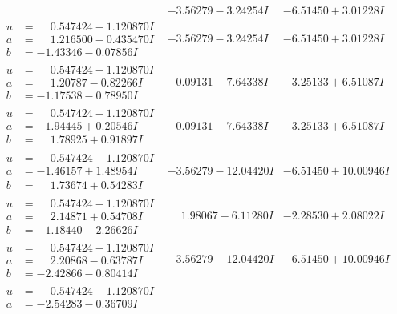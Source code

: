 \documentclass[1p]{elsarticle_modified}
\theoremstyle{definition}
\begin{document}
$$\begin{array}{c|c|c}
 & -3.56279 - 3.24254 I & -6.51450 + 3.01228 I \\ \hline\begin{aligned}
u &= \phantom{-}0.547424 - 1.120870 I \\
a &= \phantom{-}1.216500 - 0.435470 I \\
b &= -1.43346 - 0.07856 I\end{aligned}
 & -3.56279 - 3.24254 I & -6.51450 + 3.01228 I \\ \hline\begin{aligned}
u &= \phantom{-}0.547424 - 1.120870 I \\
a &= \phantom{-}1.20787 - 0.82266 I \\
b &= -1.17538 - 0.78950 I\end{aligned}
 & -0.09131 - 7.64338 I & -3.25133 + 6.51087 I \\ \hline\begin{aligned}
u &= \phantom{-}0.547424 - 1.120870 I \\
a &= -1.94445 + 0.20546 I \\
b &= \phantom{-}1.78925 + 0.91897 I\end{aligned}
 & -0.09131 - 7.64338 I & -3.25133 + 6.51087 I \\ \hline\begin{aligned}
u &= \phantom{-}0.547424 - 1.120870 I \\
a &= -1.46157 + 1.48954 I \\
b &= \phantom{-}1.73674 + 0.54283 I\end{aligned}
 & -3.56279 - 12.04420 I & -6.51450 + 10.00946 I \\ \hline\begin{aligned}
u &= \phantom{-}0.547424 - 1.120870 I \\
a &= \phantom{-}2.14871 + 0.54708 I \\
b &= -1.18440 - 2.26626 I\end{aligned}
 & \phantom{-}1.98067 - 6.11280 I & -2.28530 + 2.08022 I \\ \hline\begin{aligned}
u &= \phantom{-}0.547424 - 1.120870 I \\
a &= \phantom{-}2.20868 - 0.63787 I \\
b &= -2.42866 - 0.80414 I\end{aligned}
 & -3.56279 - 12.04420 I & -6.51450 + 10.00946 I \\ \hline\begin{aligned}
u &= \phantom{-}0.547424 - 1.120870 I \\
a &= -2.54283 - 0.36709 I \\

\end{aligned}
\end{array}$$
\end{document}

